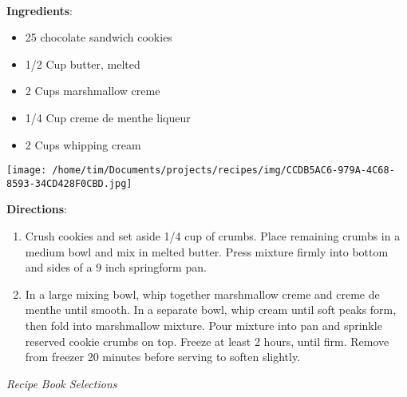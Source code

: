 \documentclass[11pt, twoside, openany]{book}
\begin{document}
 \label{creme-de-menthe-grasshopper-pie}\hfill\textit{}\\
\begin{minipage}[t]{0.8\linewidth}
\textbf{Ingredients}:\vspace{-3mm}
\begin{multicols}{2}
\begin{itemize}\setlength\itemsep{-1mm}
\item 25 chocolate sandwich cookies
\item 1/2 Cup butter, melted
\item 2 Cups marshmallow creme
\item 1/4 Cup creme de menthe liqueur
\item 2 Cups whipping cream
\end{itemize}
\end{multicols}
\end{minipage}
\begin{minipage}[t]{0.2\linewidth}
\centering \strut\vspace*{-\baselineskip}\newline
\texttt{[image: /home/tim/Documents/projects/recipes/img/CCDB5AC6-979A-4C68-8593-34CD428F0CBD.jpg]}\\
\end{minipage}\vspace{3mm}
\textbf{Directions}:
\vspace{-3mm}\begin{enumerate}\setlength\itemsep{-1mm}
\item Crush cookies and set aside 1/4 cup of crumbs. Place remaining crumbs in a medium bowl and mix in melted butter. Press mixture firmly into bottom and sides of a 9 inch springform pan.
\item In a large mixing bowl, whip together marshmallow creme and creme de menthe until smooth. In a separate bowl, whip cream until soft peaks form, then fold into marshmallow mixture. Pour mixture into pan and sprinkle reserved cookie crumbs on top. Freeze at least 2 hours, until firm. Remove from freezer 20 minutes before serving to soften slightly.
\end{enumerate}
 \label{thai-lettuce-wraps}\hfill\textit{Recipe Book Selections}\\
\end{document}
